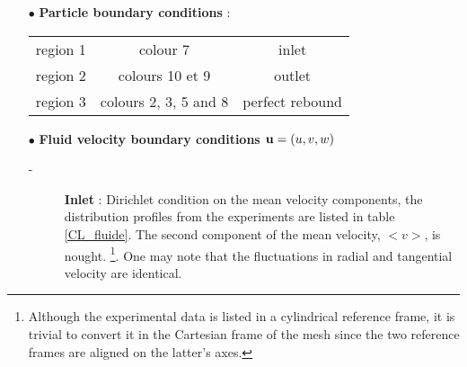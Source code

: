 \documentclass[a4paper,twoside,12pt]{article}
\begin{document}
\begin{itemize}
\item[$\bullet$] \textbf{Particle boundary conditions} :
%
\begin{table}[H]
   \begin{center}
      \begin{tabular}{lcc}
         \hline\hline
         region 1 & \quad  colour 7 \quad              & inlet           \\
         region 2 & \quad  colours 10 et 9 \quad       & outlet          \\
         region 3 & \quad  colours 2, 3, 5 and 8 \quad & perfect rebound \\
         \hline\hline
      \end{tabular}
   \end{center}
\end{table}
%

\item[$\bullet$] \textbf{Fluid velocity boundary conditions $\mathbf u=(u,v,w)$}

\begin{description}
\item[-] \textbf{Inlet} : Dirichlet condition on the mean velocity components, the distribution profiles from the experiments are listed in table \ref{CL_fluide}. The second component of the mean velocity, $<v>$, is nought. \footnote{Although the experimental data is listed in a cylindrical reference frame, it is trivial to convert it in the Cartesian frame of the mesh since the two reference frames are aligned on the latter's axes.}. One may note that the fluctuations in radial and tangential velocity are identical.


\end{description}
\end{itemize}
\end{document}
